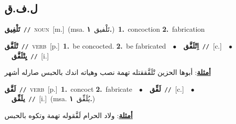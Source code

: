 \documentclass[10pt,a4paper,twoside]{article} %
\begin{document}
\begin{multicols}{2}
\vspace{-3mm}
\subsection*{\color{blue}\foreignlanguage{arabic}{ل.ف.ق}\color{blue}{}} 

{\setlength\topsep{0pt}\textbf{\foreignlanguage{arabic}{تَلْفِيق}}\ {\color{gray}\texttt{//}\color{black}}\ \textsc{noun}\ [m.]\ \color{gray}(msa. \foreignlanguage{arabic}{تَلْفيق}~\foreignlanguage{arabic}{\textbf{١.}})\color{black}\ \textbf{1.}~concoction  \textbf{2.}~fabrication\ } \vspace{2mm}

{\setlength\topsep{0pt}\textbf{\foreignlanguage{arabic}{تْلَفَّق}}\ {\color{gray}\texttt{//}\color{black}}\ \textsc{verb}\ [p.]\ \textbf{1.}~be concocted.  \textbf{2.}~be fabricated\ \ $\bullet$\ \ \setlength\topsep{0pt}\textbf{\foreignlanguage{arabic}{اِتْلَفَّق}}\ {\color{gray}\texttt{//}\color{black}}\ [c.]\ \ $\bullet$\ \ \setlength\topsep{0pt}\textbf{\foreignlanguage{arabic}{يِتْلَفَّق}}\ {\color{gray}\texttt{//}\color{black}}\ [i.]\  \begin{flushright}\color{gray}\foreignlanguage{arabic}{\textbf{\underline{\foreignlanguage{arabic}{أمثلة}}}: أبوها الحزين تْلَفَّققتله تهمة نصب وهياته اندك بالحبس صارله أشهر}\end{flushright}\color{black}} \vspace{2mm}

{\setlength\topsep{0pt}\textbf{\foreignlanguage{arabic}{لَفَّق}}\ {\color{gray}\texttt{//}\color{black}}\ \textsc{verb}\ [p.]\ \textbf{1.}~concoct  \textbf{2.}~fabricate\ \ $\bullet$\ \ \setlength\topsep{0pt}\textbf{\foreignlanguage{arabic}{لَفِّق}}\ {\color{gray}\texttt{//}\color{black}}\ [c.]\ \ $\bullet$\ \ \setlength\topsep{0pt}\textbf{\foreignlanguage{arabic}{يلَفِّق}}\ {\color{gray}\texttt{//}\color{black}}\ [i.]\ \color{gray}(msa. \foreignlanguage{arabic}{يُلَفِّق}~\foreignlanguage{arabic}{\textbf{١.}})\color{black}\  \begin{flushright}\color{gray}\foreignlanguage{arabic}{\textbf{\underline{\foreignlanguage{arabic}{أمثلة}}}: ولاد الحرام لَفَّقوله تهمة وتكوه بالحبس}\end{flushright}\color{black}} \vspace{2mm}


\end{multicols}
\end{document}
